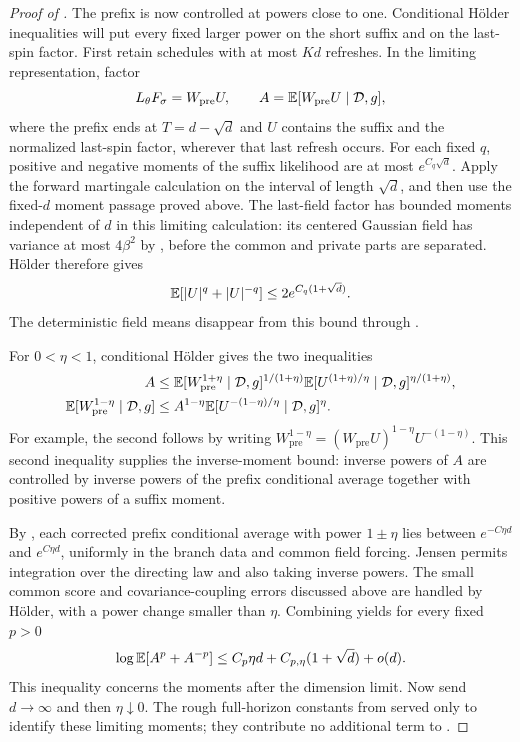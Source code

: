 \begin{proof}[Proof of ]
The prefix is now controlled at powers close to one. Conditional
H\"older inequalities will put every fixed larger power on the short
suffix and on the last-spin factor. First retain schedules with at most
$Kd$ refreshes.  In the limiting representation, factor
\[
 L_\theta F_\sigma=W_{\mathrm{pre}}U,
 \qquad A=\mathbb E[W_{\mathrm{pre}}U\mid\mathcal D,g],
\]
where the prefix ends at $T=d-\sqrt d$ and $U$ contains the suffix and
the normalized last-spin factor, wherever that last refresh occurs.
For each fixed $q$, positive and negative moments of the suffix
likelihood are at most $e^{C_q\sqrt d}$.  Apply the forward martingale
calculation on the interval of length $\sqrt d$, and then use the
fixed-$d$ moment passage proved above.  The last-field factor has
bounded moments independent of $d$ in this limiting calculation:
its centered Gaussian field has variance at most $4\beta^2$ by
, before the common and private parts are
separated.  H\"older therefore gives
\begin{equation}
 \mathbb E[|U|^q+|U|^{-q}]\le 2e^{C_q(1+\sqrt d)}.
 \label{eq:row-suffix-cost}
\end{equation}
The deterministic field means disappear from this bound through
.

For $0<\eta<1$, conditional H\"older gives the two inequalities
\begin{align}
 A&\le
  \mathbb E[W_{\mathrm{pre}}^{1+\eta}\mid\mathcal D,g]^{1/(1+\eta)}
  \mathbb E[U^{(1+\eta)/\eta}\mid\mathcal D,g]^{\eta/(1+\eta)},
 \label{eq:row-holder-upper}\\
 \mathbb E[W_{\mathrm{pre}}^{1-\eta}\mid\mathcal D,g]
 &\le A^{1-\eta}
       \mathbb E[U^{-(1-\eta)/\eta}\mid\mathcal D,g]^\eta.
 \label{eq:row-holder-lower}
\end{align}
For example, the second follows by writing
$W_{\mathrm{pre}}^{1-\eta}
 =(W_{\mathrm{pre}}U)^{1-\eta}U^{-(1-\eta)}$.
This second inequality supplies the inverse-moment bound: inverse
powers of $A$ are controlled by inverse powers of the prefix
conditional average together with positive powers of a suffix moment.

By , each corrected prefix conditional
average with power $1\pm\eta$ lies between $e^{-C\eta d}$ and
$e^{C\eta d}$, uniformly in the branch data and common field forcing.
Jensen permits integration over the directing law and also taking
inverse powers.  The small common score and covariance-coupling
errors discussed above are handled by H\"older, with a power change
smaller than $\eta$.  Combining
 yields
for every fixed $p>0$
\begin{equation}
 \log\mathbb E[A^p+A^{-p}]
       \le C_p\eta d+C_{p,\eta}(1+\sqrt d)+o(d).
 \label{eq:row-final-rate}
\end{equation}
This inequality concerns the moments after the dimension limit.  Now
send $d\to\infty$ and then $\eta\downarrow0$.  The rough full-horizon
constants from  served only to
identify these limiting moments; they contribute no additional term to
.


\end{proof}
